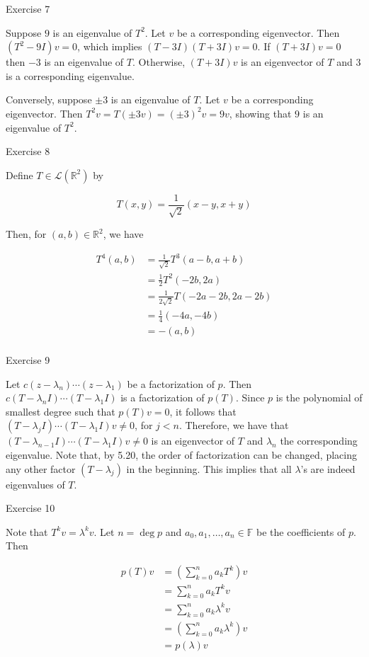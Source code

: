 \documentclass{article}
\begin{document}
Exercise 7

Suppose $9$ is an eigenvalue of $T^2$. Let $v$ be a corresponding eigenvector. Then $(T^2 - 9I)v = 0$, which implies $(T - 3I)(T + 3I)v = 0$. If $(T + 3I)v = 0$ then $-3$ is an eigenvalue of $T$. Otherwise, $(T + 3I)v$ is an eigenvector of $T$ and $3$ is a corresponding eigenvalue.

Conversely, suppose $\pm 3$ is an eigenvalue of $T$. Let $v$ be a corresponding eigenvector. Then $T^2 v = T(\pm 3v) = (\pm 3)^2 v = 9v$, showing that $9$ is an eigenvalue of $T^2$.

Exercise 8

Define $T \in \mathcal{L}(\mathbb{R}^2)$ by

$$ T(x, y) = \frac{1}{\sqrt{2}}(x - y, x + y) $$

Then, for $(a, b) \in \mathbb{R}^2$, we have

$$ \begin{aligned} T^4 (a, b) &= \frac{1}{\sqrt{2}} T^3 (a - b, a + b)\\ &= \frac{1}{2} T^2 (-2b, 2a)\\ &= \frac{1}{2\sqrt{2}} T (-2a - 2b, 2a - 2b)\\ &= \frac{1}{4}(-4a, -4b)\\ &= -(a, b)\\ \end{aligned} $$

Exercise 9

Let $c(z - \lambda_n) \dotsm (z - \lambda_1)$ be a factorization of $p$. Then $c(T - \lambda_n I) \dotsm (T - \lambda_1 I)$ is a factorization of $p(T)$. Since $p$ is the polynomial of smallest degree such that $p(T)v = 0$, it follows that $(T - \lambda_j I) \dotsm (T - \lambda_1 I)v \neq 0$, for $j < n$. Therefore, we have that $(T - \lambda_{n - 1} I) \dotsm (T - \lambda_1 I)v \neq 0$ is an eigenvector of $T$ and $\lambda_n$ the corresponding eigenvalue. Note that, by 5.20, the order of factorization can be changed, placing any other factor $(T - \lambda_j)$ in the beginning. This implies that all $\lambda$'s are indeed eigenvalues of $T$.

Exercise 10

Note that $T^k v = \lambda^k v$. Let $n = \deg p$ and $a_0, a_1, \dots, a_n \in \mathbb{F}$ be the coefficients of $p$. Then

$$ \begin{aligned} p(T)v &= (\sum\limits_{k=0}^n a_k T^k)v\\ &= \sum\limits_{k=0}^n a_k T^k v\\ &= \sum\limits_{k=0}^n a_k \lambda^k v\\ &= (\sum\limits_{k=0}^n a_k \lambda^k) v\\ &= p(\lambda) v\\ \end{aligned} $$
\end{document}
